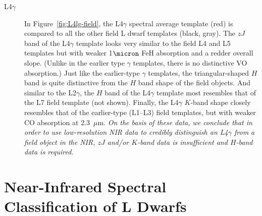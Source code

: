 \documentclass[12pt,preprint]{aastex}
\begin{document}
\begin{description}
\item[L4$\gamma$]{
In Figure~\ref{fig:L4lg-field}, the L4$\gamma$ spectral average template (red) is compared to all the other field L dwarf templates (black, gray).
The $zJ$ band of the L4$\gamma$ template looks very similar to the field L4 and L5 templates but with weaker 1$\micron$ FeH absorption and a redder overall slope. (Unlike in the earlier type $\gamma$ templates, there is no distinctive VO absorption.)
Just like the earlier-type $\gamma$ templates, the triangular-shaped $H$ band is quite distinctive from the $H$ band shape of the field objects. And similar to the L2$\gamma$, the $H$ band of the L4$\gamma$ template most resembles that of the L7 field template (not shown).
Finally, the L4$\gamma$ $K$-band shape closely resembles that of the earlier-type (L1--L3) field templates, but with weaker CO absorption at 2.3~$\mu$m.
\emph{On the basis of these data, we conclude that in order to use low-resolution NIR data to credibly distinguish an L4$\gamma$ from a field object in the NIR, $zJ$ and/or $K$-band data is insufficient and $H$-band data is required.}
}
\end{description}



\clearpage
\section{Near-Infrared Spectral Classification of L Dwarfs}
\label{sec:classification}
\end{document}

